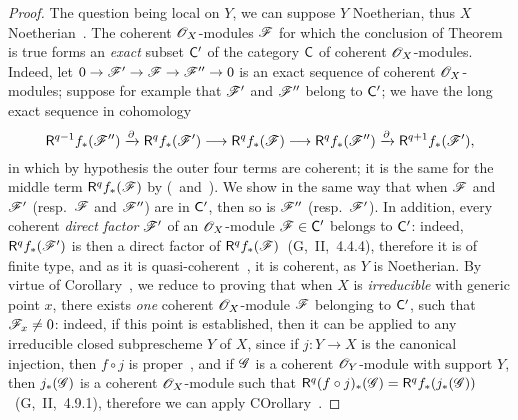 \begin{proof}
\label{proof-3.3.2.1}
The question being local on $Y$, we can suppose $Y$ Noetherian, thus $X$ Noetherian~.
The coherent $\mathscr{O}_X$-modules $\mathscr{F}$ for which the conclusion of Theorem~ is true forms an \emph{exact} subset $\mathsf{C}'$ of the category $\mathsf{C}$ of coherent $\mathscr{O}_X$-modules.
Indeed, let $0\to\sh{F}'\to\sh{F}\to\sh{F}''\to 0$ is an exact sequence of coherent $\mathscr{O}_X$-modules; suppose for example that $\mathscr{F}'$ and $\mathscr{F}''$ belong to $\mathsf{C}'$; we have the long exact sequence in cohomology
\[
  \RR^{q-1}f_*(\sh{F}'')\xrightarrow{\partial}\RR^q f_*(\sh{F}')\to\RR^q f_*(\sh{F})\to\RR^q f_*(\sh{F}'')\xrightarrow{\partial}\RR^{q+1}f_*(\sh{F}'),
\]
in which by hypothesis the outer four terms are coherent; it is the same for the middle term $\mathsf{R}^q f_*(\mathscr{F})$ by (~and~).
We show in the same way that when $\mathscr{F}$ and $\mathscr{F}'$ (resp.~$\mathscr{F}$ and $\mathscr{F}''$) are in $\mathsf{C}'$, then so is $\mathscr{F}''$ (resp.~$\mathscr{F}'$).
In addition, every coherent \emph{direct factor} $\mathscr{F}'$ of an $\mathscr{O}_X$-module $\mathscr{F}\in\mathsf{C}'$ belongs to $\mathsf{C}'$: indeed, $\mathsf{R}^q f_*(\mathscr{F}')$ is then a direct factor of $\mathsf{R}^q f_*(\mathscr{F})$~(G,~II,~4.4.4), therefore it is of finite type, and as it is quasi-coherent~, it is coherent, as $Y$ is Noetherian.
By virtue of Corollary~, we reduce to proving that when $X$ is \emph{irreducible} with generic point $x$, there exists \emph{one} coherent $\mathscr{O}_X$-module $\mathscr{F}$ belonging to $\mathsf{C}'$, such that $\mathscr{F}_x\neq 0$: indeed, if this point is established, then it can be applied to any irreducible closed subprescheme $Y$ of $X$, since if $j:Y\to X$ is the canonical injection, then $f\circ j$ is proper~, and if $\mathscr{G}$ is a coherent $\mathscr{O}_Y$-module with support $Y$, then $j_*(\mathscr{G})$ is a coherent $\mathscr{O}_X$-module such that $\mathsf{R}^q(f\circ j)_*(\mathscr{G})=\mathsf{R}^q f_*(j_*(\mathscr{G}))$~(G,~II,~4.9.1), therefore we can apply COrollary~.


\end{proof}
